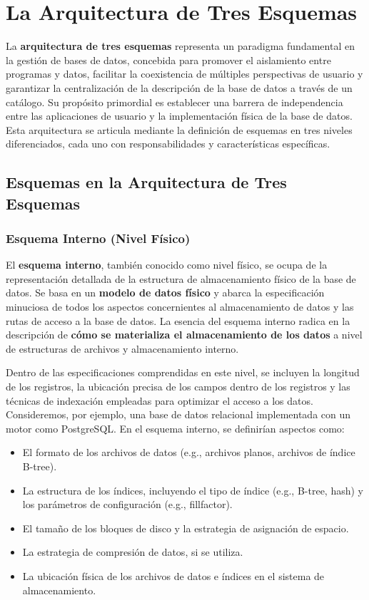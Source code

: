 \section{La Arquitectura de Tres Esquemas}

La \textbf{arquitectura de tres esquemas} representa un paradigma fundamental en la gestión de bases de datos, concebida para promover el aislamiento entre programas y datos, facilitar la coexistencia de múltiples perspectivas de usuario y garantizar la centralización de la descripción de la base de datos a través de un catálogo.  Su propósito primordial es establecer una barrera de independencia entre las aplicaciones de usuario y la implementación física de la base de datos. Esta arquitectura se articula mediante la definición de esquemas en tres niveles diferenciados, cada uno con responsabilidades y características específicas.

\subsection{Esquemas en la Arquitectura de Tres Esquemas}

\subsubsection{Esquema Interno (Nivel Físico)}

El \textbf{esquema interno}, también conocido como nivel físico, se ocupa de la representación detallada de la estructura de almacenamiento físico de la base de datos. Se basa en un \textbf{modelo de datos físico} y abarca la especificación minuciosa de todos los aspectos concernientes al almacenamiento de datos y las rutas de acceso a la base de datos. La esencia del esquema interno radica en la descripción de \textbf{cómo se materializa el almacenamiento de los datos} a nivel de estructuras de archivos y almacenamiento interno.

Dentro de las especificaciones comprendidas en este nivel, se incluyen la longitud de los registros, la ubicación precisa de los campos dentro de los registros y las técnicas de indexación empleadas para optimizar el acceso a los datos. Consideremos, por ejemplo, una base de datos relacional implementada con un motor como PostgreSQL. En el esquema interno, se definirían aspectos como:

\begin{itemize}
    \item El formato de los archivos de datos (e.g., archivos planos, archivos de índice B-tree).
    \item La estructura de los índices, incluyendo el tipo de índice (e.g., B-tree, hash) y los parámetros de configuración (e.g., fillfactor).
    \item El tamaño de los bloques de disco y la estrategia de asignación de espacio.
    \item La estrategia de compresión de datos, si se utiliza.
    \item  La ubicación física de los archivos de datos e índices en el sistema de almacenamiento.
\end{itemize}

